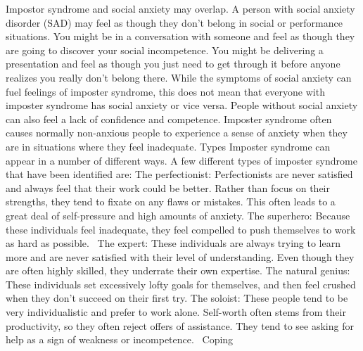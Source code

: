 \documentclass[14pt,a4paper]{extarticle}
\begin{document}
\newline\newline 
Impostor syndrome and social anxiety may overlap. A person with social anxiety disorder (SAD) may feel as though they don't belong in social or performance situations.
\newline\newline 
You might be in a conversation with someone and feel as though they are going to discover your social incompetence. You might be delivering a presentation and feel as though you just need to get through it before anyone realizes you really don't belong there.
\newline\newline 
While the symptoms of social anxiety can fuel feelings of imposter syndrome, this does not mean that everyone with imposter syndrome has social anxiety or vice versa. People without social anxiety can also feel a lack of confidence and competence. Imposter syndrome often causes normally non-anxious people to experience a sense of anxiety when they are in situations where they feel inadequate.
\newline\newline  Types \newline\newline 
Imposter syndrome can appear in a number of different ways. A few different types of imposter syndrome that have been identified are:﻿﻿
\newline\newline 
The perfectionist: Perfectionists are never satisfied and always feel that their work could be better. Rather than focus on their strengths, they tend to fixate on any flaws or mistakes. This often leads to a great deal of self-pressure and high amounts of anxiety.
The superhero: Because these individuals feel inadequate, they feel compelled to push themselves to work as hard as possible. 
The expert: These individuals are always trying to learn more and are never satisfied with their level of understanding. Even though they are often highly skilled, they underrate their own expertise.
The natural genius: These individuals set excessively lofty goals for themselves, and then feel crushed when they don't succeed on their first try.
The soloist: These people tend to be very individualistic and prefer to work alone. Self-worth often stems from their productivity, so they often reject offers of assistance. They tend to see asking for help as a sign of weakness or incompetence. 
\newline\newline  Coping \newline\newline 
\end{document}

